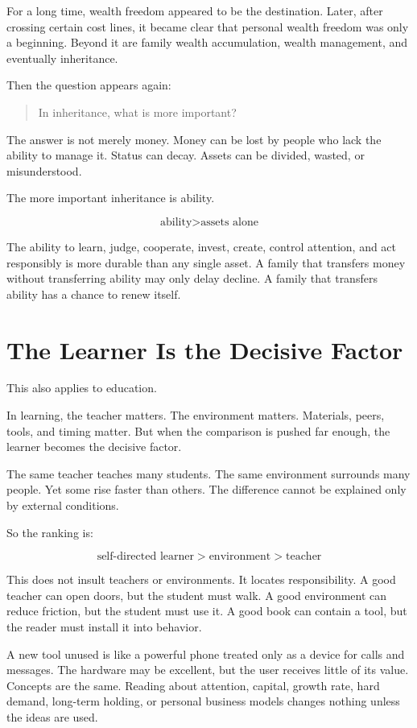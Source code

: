 For a long time, wealth freedom appeared to be the destination. Later, after crossing certain cost lines, it became clear that personal wealth freedom was only a beginning. Beyond it are family wealth accumulation, wealth management, and eventually inheritance.

Then the question appears again:

\begin{quote}
In inheritance, what is more important?
\end{quote}

The answer is not merely money. Money can be lost by people who lack the ability to manage it. Status can decay. Assets can be divided, wasted, or misunderstood.

The more important inheritance is ability.

\[
\text{ability} > \text{assets alone}
\]

The ability to learn, judge, cooperate, invest, create, control attention, and act responsibly is more durable than any single asset. A family that transfers money without transferring ability may only delay decline. A family that transfers ability has a chance to renew itself.

\section*{The Learner Is the Decisive Factor}

This also applies to education.

In learning, the teacher matters. The environment matters. Materials, peers, tools, and timing matter. But when the comparison is pushed far enough, the learner becomes the decisive factor.

The same teacher teaches many students. The same environment surrounds many people. Yet some rise faster than others. The difference cannot be explained only by external conditions.

So the ranking is:

\[
\text{self-directed learner} > \text{environment} > \text{teacher}
\]

This does not insult teachers or environments. It locates responsibility. A good teacher can open doors, but the student must walk. A good environment can reduce friction, but the student must use it. A good book can contain a tool, but the reader must install it into behavior.

A new tool unused is like a powerful phone treated only as a device for calls and messages. The hardware may be excellent, but the user receives little of its value. Concepts are the same. Reading about attention, capital, growth rate, hard demand, long-term holding, or personal business models changes nothing unless the ideas are used.

